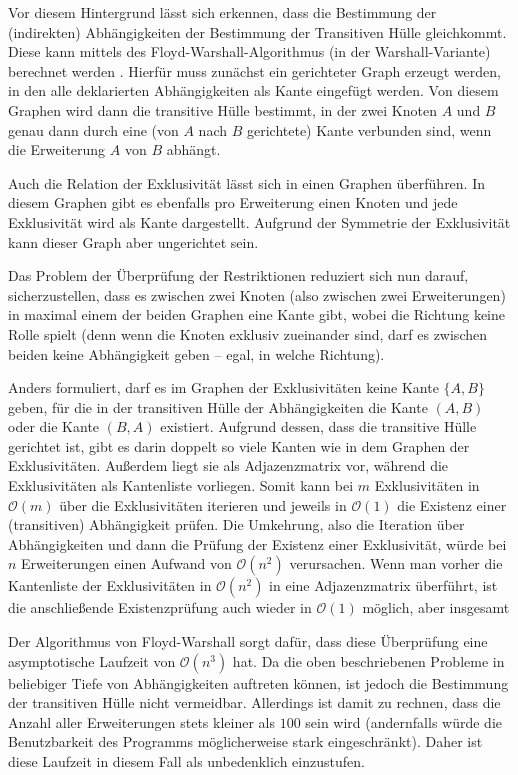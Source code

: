 Vor diesem Hintergrund lässt sich erkennen, dass die Bestimmung der (indirekten) Abhängigkeiten der Bestimmung der Transitiven Hülle gleichkommt. Diese kann mittels des Floyd-Warshall-Algorithmus (in der Warshall-Variante) berechnet werden \cite{warshal1_algorithm}. Hierfür muss zunächst ein gerichteter Graph erzeugt werden, in den alle deklarierten Abhängigkeiten als Kante eingefügt werden. Von diesem Graphen wird dann die transitive Hülle bestimmt, in der zwei Knoten $A$ und $B$ genau dann durch eine (von $A$ nach $B$ gerichtete) Kante verbunden sind, wenn die Erweiterung $A$ von $B$ abhängt.

Auch die Relation der Exklusivität lässt sich in einen Graphen überführen. In diesem Graphen gibt es ebenfalls pro Erweiterung einen Knoten und jede Exklusivität wird als Kante dargestellt. Aufgrund der Symmetrie der Exklusivität kann dieser Graph aber ungerichtet sein.

Das Problem der Überprüfung der Restriktionen reduziert sich nun darauf, sicherzustellen, dass es zwischen zwei Knoten (also zwischen zwei Erweiterungen) in maximal einem der beiden Graphen eine Kante gibt, wobei die Richtung keine Rolle spielt (denn wenn die Knoten exklusiv zueinander sind, darf es zwischen beiden keine Abhängigkeit geben -- egal, in welche Richtung).

Anders formuliert, darf es im Graphen der Exklusivitäten keine Kante $\{A, B\}$ geben, für die in der transitiven Hülle der Abhängigkeiten die Kante $(A, B)$ oder die Kante $(B, A)$ existiert. Aufgrund dessen, dass die transitive Hülle gerichtet ist, gibt es darin doppelt so viele Kanten wie in dem Graphen der Exklusivitäten. Außerdem liegt sie als Adjazenzmatrix vor, während die Exklusivitäten als Kantenliste vorliegen. Somit kann bei $m$ Exklusivitäten in $\mathcal{O}(m)$ über die Exklusivitäten iterieren und jeweils in $\mathcal{O}(1)$ die Existenz einer (transitiven) Abhängigkeit prüfen. Die Umkehrung, also die Iteration über Abhängigkeiten und dann die Prüfung der Existenz einer Exklusivität, würde bei $n$ Erweiterungen einen Aufwand von $\mathcal{O}(n^2)$ verursachen. Wenn man vorher die Kantenliste der Exklusivitäten in $\mathcal{O}(n^2)$ in eine Adjazenzmatrix überführt, ist die anschließende Existenzprüfung auch wieder in $\mathcal{O}(1)$ möglich, aber insgesamt

Der Algorithmus von Floyd-Warshall sorgt dafür, dass diese Überprüfung eine asymptotische Laufzeit von $\mathcal{O}(n^3)$ hat. Da die oben beschriebenen Probleme in beliebiger Tiefe von Abhängigkeiten auftreten können, ist jedoch die Bestimmung der transitiven Hülle nicht vermeidbar. Allerdings ist damit zu rechnen, dass die Anzahl aller Erweiterungen stets kleiner als $100$ sein wird (andernfalls würde die Benutzbarkeit des Programms möglicherweise stark eingeschränkt). Daher ist diese Laufzeit in diesem Fall als unbedenklich einzustufen.

